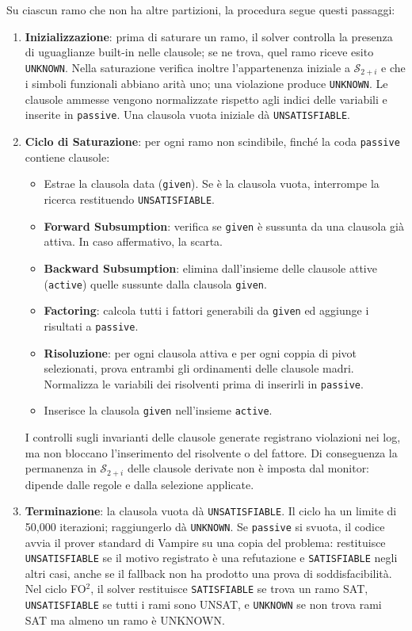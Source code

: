Su ciascun ramo che non ha altre partizioni, la procedura segue questi passaggi:
\begin{enumerate}
    \item \textbf{Inizializzazione}: prima di saturare un ramo, il solver controlla la presenza di uguaglianze built-in nelle clausole; se ne trova, quel ramo riceve esito \texttt{UNKNOWN}. Nella saturazione verifica inoltre l'appartenenza iniziale a $\mathcal{S}_{2+i}$ e che i simboli funzionali abbiano arità uno; una violazione produce \texttt{UNKNOWN}. Le clausole ammesse vengono normalizzate rispetto agli indici delle variabili e inserite in \texttt{passive}. Una clausola vuota iniziale dà \texttt{UNSATISFIABLE}.
    
    \item \textbf{Ciclo di Saturazione}: per ogni ramo non scindibile, finché la coda \texttt{passive} contiene clausole:
    \begin{itemize}
        \item Estrae la clausola data (\texttt{given}). Se è la clausola vuota, interrompe la ricerca restituendo \texttt{UNSATISFIABLE}.
        \item \textbf{Forward Subsumption}: verifica se \texttt{given} è sussunta da una clausola già attiva. In caso affermativo, la scarta.
        \item \textbf{Backward Subsumption}: elimina dall'insieme delle clausole attive (\texttt{active}) quelle sussunte dalla clausola \texttt{given}.
        \item \textbf{Factoring}: calcola tutti i fattori generabili da \texttt{given} ed aggiunge i risultati a \texttt{passive}.
        \item \textbf{Risoluzione}: per ogni clausola attiva e per ogni coppia di pivot selezionati, prova entrambi gli ordinamenti delle clausole madri. Normalizza le variabili dei risolventi prima di inserirli in \texttt{passive}.
        \item Inserisce la clausola \texttt{given} nell'insieme \texttt{active}.
    \end{itemize}

    I controlli sugli invarianti delle clausole generate registrano violazioni nei log, ma non bloccano l'inserimento del risolvente o del fattore. Di conseguenza la permanenza in $\mathcal{S}_{2+i}$ delle clausole derivate non è imposta dal monitor: dipende dalle regole e dalla selezione applicate.
    
    \item \textbf{Terminazione}: la clausola vuota dà \texttt{UNSATISFIABLE}. Il ciclo ha un limite di 50,000 iterazioni; raggiungerlo dà \texttt{UNKNOWN}. Se \texttt{passive} si svuota, il codice avvia il prover standard di Vampire su una copia del problema: restituisce \texttt{UNSATISFIABLE} se il motivo registrato è una refutazione e \texttt{SATISFIABLE} negli altri casi, anche se il fallback non ha prodotto una prova di soddisfacibilità. Nel ciclo FO$^2$, il solver restituisce \texttt{SATISFIABLE} se trova un ramo SAT, \texttt{UNSATISFIABLE} se tutti i rami sono UNSAT, e \texttt{UNKNOWN} se non trova rami SAT ma almeno un ramo è UNKNOWN.
\end{enumerate}

